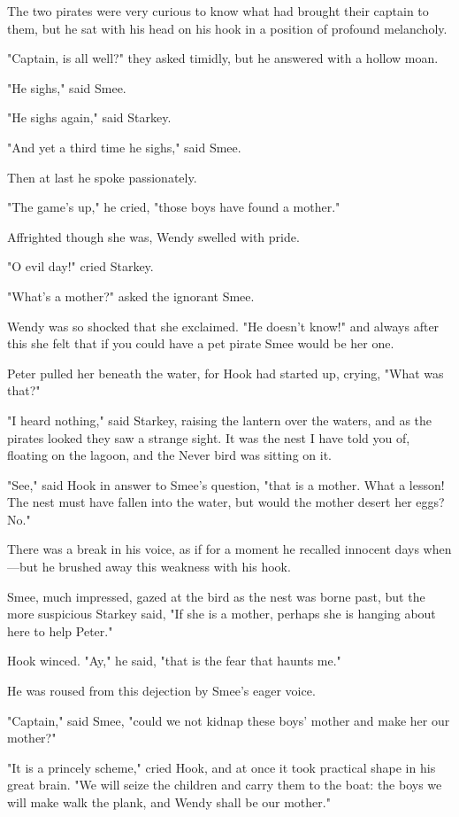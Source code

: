 The two pirates were very curious to know what had brought their captain to them, but he sat with his head on his hook in a position of profound melancholy.

"Captain, is all well?\@" they asked timidly, but he answered with a hollow moan.

"He sighs," said Smee.

"He sighs again," said Starkey.

"And yet a third time he sighs," said Smee.

Then at last he spoke passionately.

"The game's up," he cried, "those boys have found a mother."

Affrighted though she was, Wendy swelled with pride.

"O evil day!\@" cried Starkey.

"What's a mother?\@" asked the ignorant Smee.

Wendy was so shocked that she exclaimed.
"He doesn't know!\@" and always after this she felt that if you could have a pet pirate Smee would be her one.

Peter pulled her beneath the water, for Hook had started up, crying, "What was that?"

"I heard nothing," said Starkey, raising the lantern over the waters, and as the pirates looked they saw a strange sight.
It was the nest I have told you of, floating on the lagoon, and the Never bird was sitting on it.

"See," said Hook in answer to Smee's question, "that is a mother.
What a lesson!
The nest must have fallen into the water, but would the mother desert her eggs?
No."

There was a break in his voice, as if for a moment he recalled innocent days when—but he brushed away this weakness with his hook.

Smee, much impressed, gazed at the bird as the nest was borne past, but the more suspicious Starkey said, "If she is a mother, perhaps she is hanging about here to help Peter."

Hook winced.
"Ay," he said, "that is the fear that haunts me."

He was roused from this dejection by Smee's eager voice.

"Captain," said Smee, "could we not kidnap these boys' mother and make her our mother?"

"It is a princely scheme," cried Hook, and at once it took practical shape in his great brain.
"We will seize the children and carry them to the boat:
the boys we will make walk the plank, and Wendy shall be our mother."

